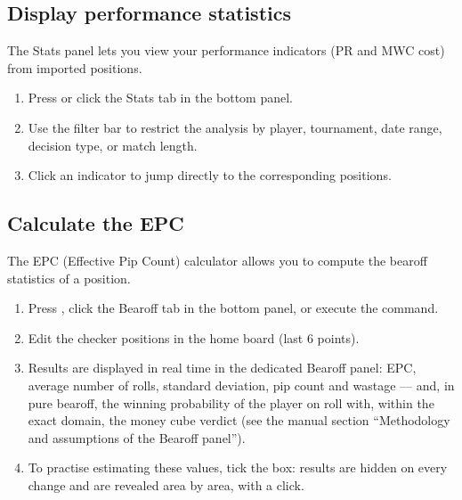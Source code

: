 \documentclass[letterpaper,10pt,english]{sphinxmanual}
\begin{document}
\subsection{Display performance statistics}
\label{\detokenize{guide_utilisateur:afficher-les-statistiques-de-performance}}
\sphinxAtStartPar
The Stats panel lets you view your performance indicators (PR and MWC cost) from imported positions.
\begin{enumerate}
%
\item {} 
\sphinxAtStartPar
Press  or click the Stats tab in the bottom panel.

\item {} 
\sphinxAtStartPar
Use the filter bar to restrict the analysis by player, tournament, date range, decision type, or match length.

\item {} 
\sphinxAtStartPar
Click an indicator to jump directly to the corresponding positions.

\end{enumerate}


\subsection{Calculate the EPC}
\label{\detokenize{guide_utilisateur:calculer-l-epc}}
\sphinxAtStartPar
The EPC (Effective Pip Count) calculator allows you to compute the bearoff statistics of a position.
\begin{enumerate}
%
\item {} 
\sphinxAtStartPar
Press , click the Bearoff tab in the bottom panel, or execute the  command.

\item {} 
\sphinxAtStartPar
Edit the checker positions in the home board (last 6 points).

\item {} 
\sphinxAtStartPar
Results are displayed in real time in the dedicated Bearoff panel: EPC, average number of rolls, standard deviation, pip count and wastage — and, in pure bearoff, the winning probability of the player on roll with, within the exact domain, the money cube verdict (see the manual section “Methodology and assumptions of the Bearoff panel”).

\item {} 
\sphinxAtStartPar
To practise estimating these values, tick the  box: results are hidden on every change and are revealed area by area, with a click.

\end{enumerate}
\end{document}

